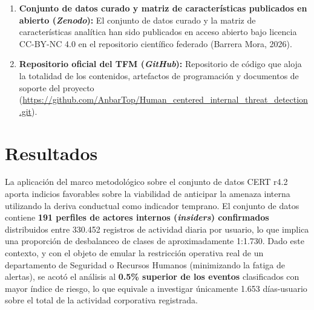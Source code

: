 \documentclass[IB]{TFUOC}%
\begin{document}
\begin{enumerate}
    \item \textbf{Conjunto de datos curado y matriz de características publicados en abierto (\textit{Zenodo}):}\newline
    El conjunto de datos curado y la matriz de características analítica han sido publicados en acceso abierto bajo licencia CC-BY-NC 4.0 en el repositorio científico federado (Barrera Mora, 2026).

    \item \textbf{Repositorio oficial del TFM (\textit{GitHub}):}\newline
    Repositorio de código que aloja la totalidad de los contenidos, artefactos de programación y documentos de soporte del proyecto (\url{https://github.com/AnbarTop/Human_centered_internal_threat_detection.git}).
\end{enumerate}

\chapter{Resultados}
La aplicación del marco metodológico sobre el conjunto de datos CERT r4.2 aporta indicios favorables sobre la viabilidad de anticipar la amenaza interna utilizando la deriva conductual como indicador temprano. El conjunto de datos contiene \textbf{191 perfiles de actores internos (\textit{insiders}) confirmados} distribuidos entre 330.452 registros de actividad diaria por usuario, lo que implica una proporción de desbalanceo de clases de aproximadamente 1:1.730. Dado este contexto, y con el objeto de emular la restricción operativa real de un departamento de Seguridad o Recursos Humanos (minimizando la fatiga de alertas), se acotó el análisis al \textbf{0.5\% superior de los eventos} clasificados con mayor índice de riesgo, lo que equivale a investigar únicamente 1.653 días-usuario sobre el total de la actividad corporativa registrada.
\end{document}
